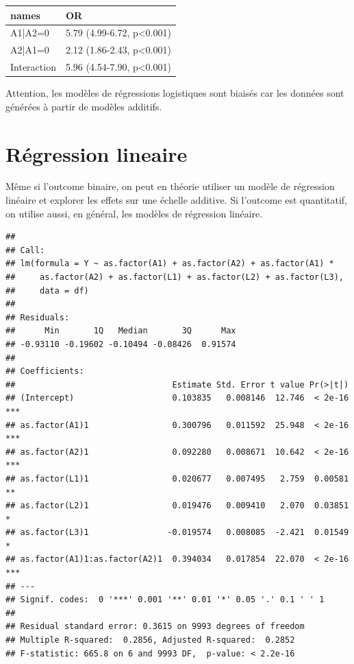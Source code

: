 \documentclass[
]{book}
\begin{document}
\begin{table}
\centering
\begin{tabular}[t]{l|l}
\hline
names & OR\\
\hline
A1|A2=0 & 5.79 (4.99-6.72, p<0.001)\\
\hline
A2|A1=0 & 2.12 (1.86-2.43, p<0.001)\\
\hline
Interaction & 5.96 (4.54-7.90, p<0.001)\\
\hline
\end{tabular}
\end{table}

Attention, les modèles de régressions logistiques sont biaisés car les données sont générées à partir de modèles additifs.

\hypertarget{ruxe9gression-lineaire}{%
\section{Régression lineaire}\label{ruxe9gression-lineaire}}

Même si l'outcome binaire, on peut en théorie utiliser un modèle de régression linéaire et explorer les effets sur une échelle additive. Si l'outcome est quantitatif, on utilise aussi, en général, les modèles de régression linéaire.

\begin{verbatim}
## 
## Call:
## lm(formula = Y ~ as.factor(A1) + as.factor(A2) + as.factor(A1) * 
##     as.factor(A2) + as.factor(L1) + as.factor(L2) + as.factor(L3), 
##     data = df)
## 
## Residuals:
##      Min       1Q   Median       3Q      Max 
## -0.93110 -0.19602 -0.10494 -0.08426  0.91574 
## 
## Coefficients:
##                                Estimate Std. Error t value Pr(>|t|)    
## (Intercept)                    0.103835   0.008146  12.746  < 2e-16 ***
## as.factor(A1)1                 0.300796   0.011592  25.948  < 2e-16 ***
## as.factor(A2)1                 0.092280   0.008671  10.642  < 2e-16 ***
## as.factor(L1)1                 0.020677   0.007495   2.759  0.00581 ** 
## as.factor(L2)1                 0.019476   0.009410   2.070  0.03851 *  
## as.factor(L3)1                -0.019574   0.008085  -2.421  0.01549 *  
## as.factor(A1)1:as.factor(A2)1  0.394034   0.017854  22.070  < 2e-16 ***
## ---
## Signif. codes:  0 '***' 0.001 '**' 0.01 '*' 0.05 '.' 0.1 ' ' 1
## 
## Residual standard error: 0.3615 on 9993 degrees of freedom
## Multiple R-squared:  0.2856, Adjusted R-squared:  0.2852 
## F-statistic: 665.8 on 6 and 9993 DF,  p-value: < 2.2e-16
\end{verbatim}
\end{document}
